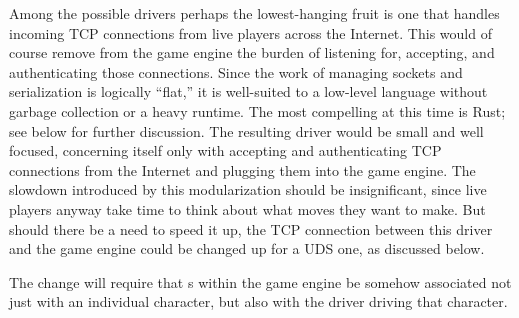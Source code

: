 Among the possible drivers perhaps the lowest-hanging fruit is one that
handles incoming TCP connections from live players across the Internet.
This would of course remove from the game engine the burden of listening for,
accepting, and authenticating those connections.
Since the work of managing sockets and serialization is logically ``flat,''
it is well-suited to a low-level language without garbage collection or a
heavy runtime.
The most compelling at this time is Rust;
see below for further discussion.
The resulting driver would be small and well focused, concerning itself
only with accepting and authenticating TCP connections from the Internet and
plugging them into the game engine.
The slowdown introduced by this modularization should be insignificant, since
live players anyway take time to think about what moves they want to make.
But should there be a need to speed it up, the TCP connection
between this driver and the game engine could be changed up for a UDS one,
as discussed below.

The change will require that s within the game engine be somehow
associated not just with an individual character, but also with the driver
driving that character.
